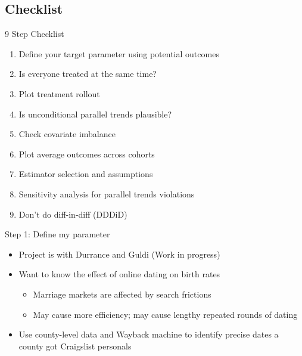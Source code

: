 \documentclass{beamer}
\begin{document}
\subsection{Checklist}

\begin{frame}{9 Step Checklist}

\begin{enumerate}

\item Define your target parameter using potential outcomes
\item Is everyone treated at the same time?
\item Plot treatment rollout
\item Is unconditional parallel trends plausible?
\item Check covariate imbalance
\item Plot average outcomes across cohorts
\item Estimator selection and assumptions
\item Sensitivity analysis for parallel trends violations
\item Don't do diff-in-diff (DDDiD)

\end{enumerate}

\end{frame}






\begin{frame}{Step 1: Define my parameter}

\begin{itemize}

\item Project is with Durrance and Guldi (Work in progress)
\item Want to know the effect of online dating on birth rates
	\begin{itemize}
	\item Marriage markets are affected by search frictions
	\item May cause more efficiency; may cause lengthy repeated rounds of dating
	\end{itemize}
\item Use county-level data and Wayback machine to identify precise dates a county got Craigslist personals

\end{itemize}

\end{frame}
\end{document}
